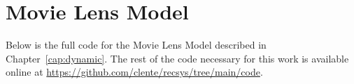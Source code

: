 
%

\chapter{Movie Lens Model}
\label{apx:model}

Below is the full code for the Movie Lens Model described in
Chapter~\ref{cap:dynamic}. The rest of the code necessary for this work is available online at
\href{https://github.com/clente/recsys/tree/main/code}{https://github.com/clente/recsys/tree/main/code}.

